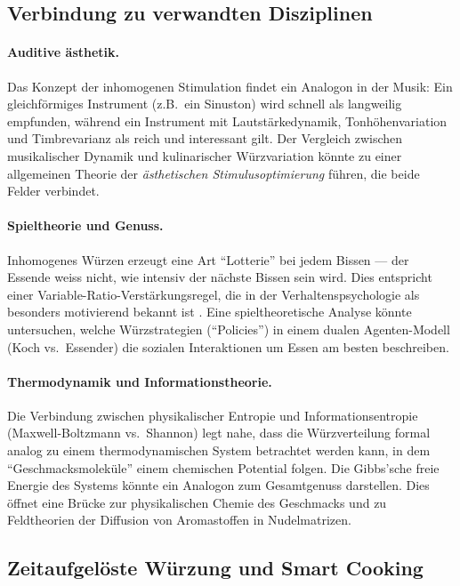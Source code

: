 ﻿\documentclass[12pt,a4paper]{article}
\theoremstyle{definition}
\begin{document}
\subsection{Verbindung zu verwandten Disziplinen}

\paragraph{Auditive ästhetik.}
Das Konzept der inhomogenen Stimulation findet ein Analogon in der
Musik: Ein gleichförmiges Instrument (z.B.\ ein Sinuston) wird schnell
als langweilig empfunden, während ein Instrument mit Lautstärkedynamik,
Tonhöhenvariation und Timbrevarianz als reich und interessant gilt.
Der Vergleich zwischen musikalischer Dynamik und kulinarischer
Würzvariation könnte zu einer allgemeinen Theorie der \emph{ästhetischen
Stimulusoptimierung} führen, die beide Felder verbindet.

\paragraph{Spieltheorie und Genuss.}
Inhomogenes Würzen erzeugt eine Art ``Lotterie'' bei jedem Bissen ---
der Essende weiss nicht, wie intensiv der nächste Bissen sein wird.
Dies entspricht einer Variable-Ratio-Verstärkungsregel, die in der
Verhaltenspsychologie als besonders motivierend bekannt ist \cite{skinner1938}.
Eine spieltheoretische Analyse könnte untersuchen, welche Würzstrategien
(``Policies'') in einem dualen Agenten-Modell (Koch vs.\ Essender) die
sozialen Interaktionen um Essen am besten beschreiben.

\paragraph{Thermodynamik und Informationstheorie.}
Die Verbindung zwischen physikalischer Entropie und Informationsentropie
(Maxwell-Boltzmann vs.\ Shannon) legt nahe, dass die Würzverteilung
formal analog zu einem thermodynamischen System betrachtet werden kann,
in dem ``Geschmacksmoleküle'' einem chemischen Potential folgen. Die
Gibbs'sche freie Energie des Systems könnte ein Analogon zum Gesamtgenuss
darstellen. Dies öffnet eine Brücke zur physikalischen Chemie des
Geschmacks und zu Feldtheorien der Diffusion von Aromastoffen in
Nudelmatrizen.

\subsection{Zeitaufgelöste Würzung und Smart Cooking}
\end{document}
